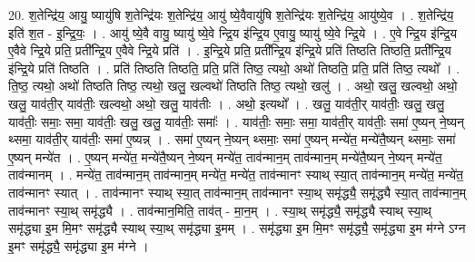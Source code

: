 \documentclass[17pt]{extarticle}
\begin{document}
20. श॒तेन्द्रि॑य॒ आयु॒ ष्यायु॑षि श॒तेन्द्रि॑यः श॒तेन्द्रि॑य॒ आयु॑ ष्ये॒वैवायु॑षि श॒तेन्द्रि॑यः श॒तेन्द्रि॑य॒ आयु॑ष्ये॒व । . श॒तेन्द्रि॑य॒ इति॑ श॒त - इ॒न्द्रि॒यः॒ । . आयु॑ ष्ये॒वै वायु॒ ष्यायु॑ ष्ये॒वे न्द्रि॒य इ॑न्द्रि॒य ए॒वायु॒ ष्यायु॑ ष्ये॒वे न्द्रि॒ये । . ए॒वे न्द्रि॒य इ॑न्द्रि॒य ए॒वैवे न्द्रि॒ये प्रति॒ प्रती᳚न्द्रि॒य ए॒वैवे न्द्रि॒ये प्रति॑ । . इ॒न्द्रि॒ये प्रति॒ प्रती᳚न्द्रि॒य इ॑न्द्रि॒ये प्रति॑ तिष्ठति तिष्ठति॒ प्रती᳚न्द्रि॒य इ॑न्द्रि॒ये प्रति॑ तिष्ठति । . प्रति॑ तिष्ठति तिष्ठति॒ प्रति॒ प्रति॑ तिष्ठ॒ त्यथो॒ अथो॑ तिष्ठति॒ प्रति॒ प्रति॑ तिष्ठ॒ त्यथो᳚ । . ति॒ष्ठ॒ त्यथो॒ अथो॑ तिष्ठति तिष्ठ॒ त्यथो॒ खलु॒ खल्वथो॑ तिष्ठति तिष्ठ॒ त्यथो॒ खलु॑ । . अथो॒ खलु॒ खल्वथो॒ अथो॒ खलु॒ याव॑ती॒र् याव॑तीः॒ खल्वथो॒ अथो॒ खलु॒ याव॑तीः । . अथो॒ इत्यथो᳚ । . खलु॒ याव॑ती॒र् याव॑तीः॒ खलु॒ खलु॒ याव॑तीः॒ समाः॒ समा॒ याव॑तीः॒ खलु॒ खलु॒ याव॑तीः॒ समाः᳚ । . याव॑तीः॒ समाः॒ समा॒ याव॑ती॒र् याव॑तीः॒ समा॑ ए॒ष्यन् ने॒ष्यन् थ्समा॒ याव॑ती॒र् याव॑तीः॒ समा॑ ए॒ष्यन्न् । . समा॑ ए॒ष्यन् ने॒ष्यन् थ्समाः॒ समा॑ ए॒ष्यन् मन्ये॑त॒ मन्ये॑तै॒ष्यन् थ्समाः॒ समा॑ ए॒ष्यन् मन्ये॑त । . ए॒ष्यन् मन्ये॑त॒ मन्ये॑तै॒ष्यन् ने॒ष्यन् मन्ये॑त॒ ताव॑न्मान॒म् ताव॑न्मान॒म् मन्ये॑तै॒ष्यन् ने॒ष्यन् मन्ये॑त॒ ताव॑न्मानम् । . मन्ये॑त॒ ताव॑न्मान॒म् ताव॑न्मान॒म् मन्ये॑त॒ मन्ये॑त॒ ताव॑न्मानꣳ स्याथ् स्या॒त् ताव॑न्मान॒म् मन्ये॑त॒ मन्ये॑त॒ ताव॑न्मानꣳ स्यात् । . ताव॑न्मानꣳ स्याथ् स्या॒त् ताव॑न्मान॒म् ताव॑न्मानꣳ स्या॒थ् समृ॑द्ध्यै॒ समृ॑द्ध्यै स्या॒त् ताव॑न्मान॒म् ताव॑न्मानꣳ स्या॒थ् समृ॑द्ध्यै । . ताव॑न्मान॒मिति॒ ताव॑त् - मा॒न॒म् । . स्या॒थ् समृ॑द्ध्यै॒ समृ॑द्ध्यै स्याथ् स्या॒थ् समृ॑द्ध्या इ॒म मि॒मꣳ समृ॑द्ध्यै स्याथ् स्या॒थ् समृ॑द्ध्या इ॒मम् । . समृ॑द्ध्या इ॒म मि॒मꣳ समृ॑द्ध्यै॒ समृ॑द्ध्या इ॒म म॑ग्ने ऽग्न इ॒मꣳ समृ॑द्ध्यै॒ समृ॑द्ध्या इ॒म म॑ग्ने । \newline
\end{document}
